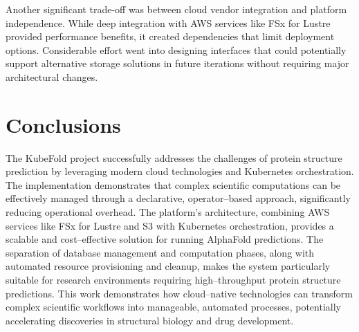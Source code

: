 Another significant trade-off was between cloud vendor integration and platform independence. While deep integration with AWS services like FSx for Lustre provided performance benefits, it created dependencies that limit deployment options. Considerable effort went into designing interfaces that could potentially support alternative storage solutions in future iterations without requiring major architectural changes.

\section{Conclusions}

The KubeFold project successfully addresses the challenges of protein structure prediction by leveraging modern cloud technologies and Kubernetes orchestration.
The implementation demonstrates that complex scientific computations can be effectively managed through a declarative, operator--based approach, significantly reducing operational overhead.
The platform's architecture, combining AWS services like FSx for Lustre and S3 with Kubernetes orchestration, provides a scalable and cost--effective solution for running AlphaFold predictions.
The separation of database management and computation phases, along with automated resource provisioning and cleanup, makes the system particularly suitable for research environments requiring high--throughput protein structure predictions.
This work demonstrates how cloud--native technologies can transform complex scientific workflows into manageable, automated processes, potentially accelerating discoveries in structural biology and drug development.